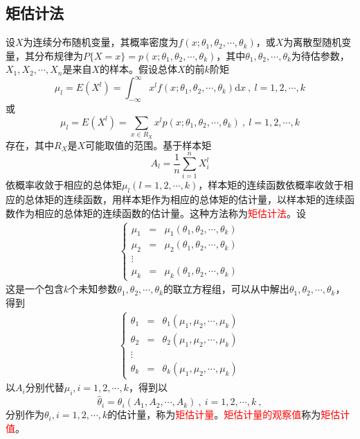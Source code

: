 \documentclass[12pt,a4paper]{article}
\newcommand{\dif}{\mathrm{d}}
\begin{document}
\subsection{矩估计法}
设$X$为连续分布随机变量，其概率密度为$f(x;\theta_1,\theta_2,\cdots,\theta_k)$，或$X$为离散型随机变量，其分布规律为$P\{X=x\}=p(x;\theta_1,\theta_2,\cdots,\theta_k)$，其中$\theta_1,\theta_2,\cdots,\theta_k$为待估参数，$X_1, X_2, \cdots, X_n$是来自$X$的样本。假设总体$X$的前$k$阶矩
\begin{equation*}
\mu_l = E(X^l) = \int_{-\infty}^\infty x^l f(x;\theta_1,\theta_2,\cdots,\theta_k) \dif x ~, ~ l = 1, 2, \cdots, k
\end{equation*}
或
\begin{equation*}
\mu_l = E(X^l) = \sum_{x\in R_X} x^l p(x;\theta_1,\theta_2,\cdots,\theta_k) ~, ~ l = 1, 2, \cdots, k
\end{equation*}
存在，其中$R_X$是$X$可能取值的范围。基于样本矩
\begin{equation*}
A_l = \frac{1}{n}\sum_{i=1}^n X_i^l
\end{equation*}
依概率收敛于相应的总体矩$\mu_l (l = 1, 2, \cdots, k)$，样本矩的连续函数依概率收敛于相应的总体矩的连续函数，用样本矩作为相应的总体矩的估计量，以样本矩的连续函数作为相应的总体矩的连续函数的估计量。这种方法称为\textcolor{red}{矩估计法}。设
\begin{eqnarray*}
\left\{
\begin{aligned}
\mu_1 & = & \mu_1(\theta_1,\theta_2,\cdots,\theta_k) \\
\mu_2 & = & \mu_2(\theta_1,\theta_2,\cdots,\theta_k) \\
\vdots \\
\mu_k & = & \mu_k(\theta_1,\theta_2,\cdots,\theta_k)
\end{aligned}
\right.
\end{eqnarray*}
这是一个包含$k$个未知参数$\theta_1,\theta_2,\cdots,\theta_k$的联立方程组，可以从中解出$\theta_1,\theta_2,\cdots,\theta_k$，得到
\begin{eqnarray*}
\left\{
\begin{aligned}
\theta_1 & = & \theta_1(\mu_1,\mu_2,\cdots,\mu_k) \\
\theta_2 & = & \theta_2(\mu_1,\mu_2,\cdots,\mu_k) \\
\vdots \\
\theta_k & = & \theta_k(\mu_1,\mu_2,\cdots,\mu_k)
\end{aligned}
\right.
\end{eqnarray*}
以$A_i$分别代替$\mu_i, i = 1, 2, \cdots, k$，得到以
\begin{equation*}
\hat{\theta}_i = \theta_i(A_1, A_2, \cdots, A_k) ~, ~ i = 1, 2, \cdots, k ~,
\end{equation*}
分别作为$\theta_i, i = 1, 2, \cdots, k$的估计量，称为\textcolor{red}{矩估计量}。\textcolor{red}{矩估计量的观察值}称为\textcolor{red}{矩估计值}。
\end{document}

